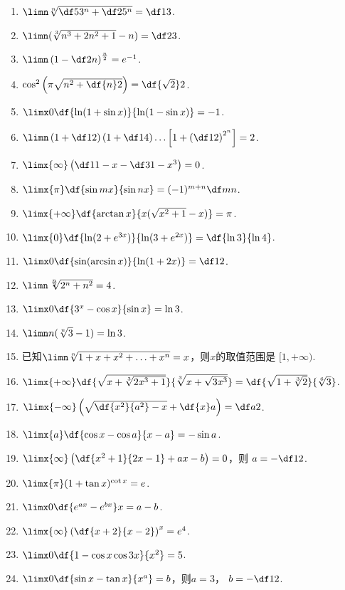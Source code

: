 \begin{enumerate}
	\item $\limn\sqrt[n]{\df5{3^n}+\df2{5^n}}=\df13$.
	\item $\limn(\sqrt[3]{n^3+2n^2+1}-n)=\df23$.
	\item $\limn\left(1-\df2n\right)^{\frac n2}=e^{-1}$.
	\item $\cos^2\left(\pi\sqrt{n^2+\df{n}2}\right)=\df{\sqrt2}2$.
	\item $\limx0\df{\ln(1+\sin x)}{\ln(1-\sin x)}=-1$.
	\item $\limn\left(1+\df12\right)\left(1+\df14\right)
	\ldots\left[1+\left(\df12\right)^{2^n}\right]=2$.
	\item $\limx{\infty}\left(\df1{1-x}-\df3{1-x^3}\right)=0$.
	\item $\limx{\pi}\df{\sin mx}{\sin nx}=(-1)^{m+n}\df mn$.
	\item $\limx{+\infty}\df{\arctan x}{x(\sqrt{x^2+1}-x)}=\pi$.
	\item $\limx{0}\df{\ln(2+e^{3x})}{\ln(3+e^{2x})}=\df{\ln3}{\ln4}$.
	\item $\limx0\df{\sin(\arcsin x)}{\ln(1+2x)}=\df12$.
	\item $\limn\sqrt[\frac n2]{2^n+n^2}=4$.
	\item $\limx0\df{3^x-\cos x}{\sin x}=\ln3$.
	\item $\limn n(\sqrt[n]{3}-1)=\ln3$.
	\item 已知$\limn\sqrt[n]{1+x+x^2+\ldots+x^n}=x$，则$x$的取值范围是
	$[1,+\infty)$.
	\item $\limx{+\infty}\df{\sqrt{x+\sqrt[3]{2x^3+1}}}{\sqrt[3]
	{x+\sqrt{3x^3}}}=\df{\sqrt{1+\sqrt[3]{2}}}{\sqrt[6]{3}}$.
	\item $\limx{-\infty}\left(\sqrt{\df{x^2}{a^2}-x}
	+\df{x}a\right)=\df a2$.
	\item $\limx{a}\df{\cos x-\cos a}{x-a}=-\sin a$.
	\item $\limx{\infty}\left(\df{x^2+1}{2x-1}+ax-b\right)=0$，则
	$a=-\df12$.
	\item $\limx{\pi}(1+\tan x)^{\cot x}=e$.
	\item $\limx0\df{e^{ax}-e^{bx}}x=a-b$.
	\item $\limx{\infty}\left(\df{x+2}{x-2}\right)^x=e^4$.
	\item $\limx0\df{1-\cos x\cos 3x}{x^2}=5$.
	\item $\limx0\df{\sin x-\tan x}{x^a}=b$，则$a=3$，
	$b=-\df12$.
\end{enumerate}